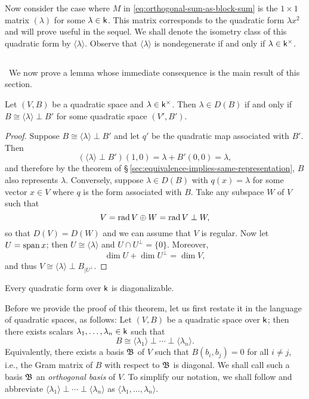 Now consider the case where \(M\) in \eqref{eq:orthogonal-sum-as-block-sum} is
the \(1 \times 1\) matrix \((\lambda)\) for some \(\lambda \in \mathsf{k}\). This
matrix corresponds to the quadratic form \(\lambda x^2\) and will prove useful
in the sequel. We shall denote the isometry class of this quadratic form by
\(\langle \lambda \rangle\). Observe that \(\langle \lambda \rangle\) is
nondegenerate if and only if \(\lambda \in \mathsf{k}^{\times}\).

\subsection{}~We now prove a lemma whose immediate consequence is the main
result of this section.\label{sec:diagonalization-of-forms}

\begin{lemma}
    {\normalfont \cite[p.~9]{lam1973quadratic}} Let \((V, B)\) be a quadratic
    space and \(\lambda \in \mathsf{k}^{\times}\). Then \(\lambda \in D(B)\) if and
    only if \(B \cong \langle \lambda \rangle \perp B'\) for some quadratic
    space \((V', B')\).
\end{lemma}

\begin{proof}
  Suppose \(B \cong \langle \lambda \rangle \perp B'\) and let \(q'\) be the
  quadratic map associated with \(B'\). Then
  \[
    (\langle \lambda \rangle \perp B') (1, 0) = \lambda + B'(0,0) = \lambda,
  \]
  and therefore by the theorem of
  \S\,\ref{sec:equivalence-implies-same-representation}, \(B\) also represents
  \(\lambda\). Conversely, suppose \(\lambda \in D(B)\) with \(q(x) = \lambda\)
  for some vector \(x \in V\) where \(q\) is the form associated with \(B\).
  Take any subspace \(W\) of \(V\) such that
  \[
    V = \operatorname{rad} V \oplus W = \operatorname{rad} V \perp W,
  \]
  so that \(D(V) = D(W)\) and we can assume that \(V\) is regular. Now let \(U =
  \operatorname{span} x\); then \(U \cong \langle \lambda \rangle\) and \(U \cap U^{\perp} =
  \{0\}\). Moreover,
  \[
    \dim U + \dim U^{\perp} = \dim V,
  \]
  and thus \(V \cong \langle \lambda \rangle \perp B_{|U^{\perp}}\).
\end{proof}

\begin{theorem}
    Every quadratic form over \(\mathsf{k}\) is diagonalizable.
\end{theorem}

Before we provide the proof of this theorem, let us first restate it in the
language of quadratic spaces, as follows: Let \((V, B)\) be a quadratic space
over \(\mathsf{k}\); then there exists scalars \(\lambda_1, \dots, \lambda_n \in
\mathsf{k}\) such that
\[
  B \cong \langle \lambda_1 \rangle \perp \cdots \perp \langle \lambda_n \rangle.  
\]
Equivalently, there exists a basis \(\mathfrak{B}\) of \(V\) such that \(B(b_i, b_j) =
0\) for all \(i \neq j\), i.e., the Gram matrix of \(B\) with respect to
\(\mathfrak{B}\) is diagonal. We shall call such a basis \(\mathfrak{B}\) an
\emph{orthogonal basis} of \(V\). To simplify our notation, we shall follow
\cite{lam1973quadratic} and abbreviate \(\langle \lambda_1 \rangle \perp \cdots
\perp \langle \lambda_n \rangle\) as \(\langle \lambda_1, \dots, \lambda_n
\rangle\).\label{sec:lambda-class}

